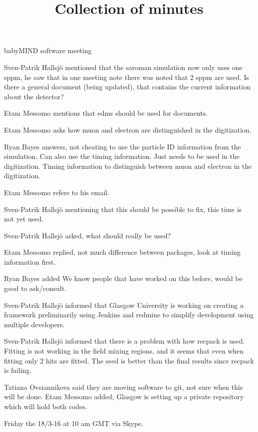 \documentclass{article}
\title{Collection of minutes}
\author{\LaTeXe}
\begin{document}
\begin{Minutes}{babyMIND software meeting}
\maketitle


Sven-Patrik Hallsj\"o  mentioned that the saroman simulation now only uses one sppm, he saw that in one meeting note there was noted that 2 sppm are used. Is there a general document (being updated), that contains the current information about the detector? 

Etam Messomo mentions that edms should be used for documents.

Etam Messomo asks how muon and electron are distinguished in the digitization. 

Ryan Bayes answers, not cheating to use the particle ID information from the simulation. Can also use the timing information. Just needs to be used in the digitization. Timing information to distinguish between muon and electron in the digitization. 

Etam Messomo refers to his email.

Sven-Patrik Hallsj\"o mentioning that this should be possible to fix, this time is not yet used.

Sven-Patrik Hallsj\"o asked, what should really be used?

Etam Messomo replied, not much difference between packages, look at timing information first.

Ryan Bayes added We know people that have worked on this before, would be good to ask/consult. 

Sven-Patrik Hallsj\"o informed that Glasgow University is working on creating a framework preliminarily using Jenkins and redmine to simplify development using multiple developers. 

Sven-Patrik Hallsj\"o informed that there is a problem with how recpack is used. Fitting is not working in the field mixing regions, and it seems that even when fitting only 2 hits are fitted. The seed is better than the final results since recpack is failing.

Tatiana Ovsiannikova said they are moving software to git, not sure when this will be done. 
Etam Messomo added, Glasgow is setting up a private repository which will hold both codes.

Friday the 18/3-16 at 10 am GMT via Skype.

\end{Minutes}
\end{document}
